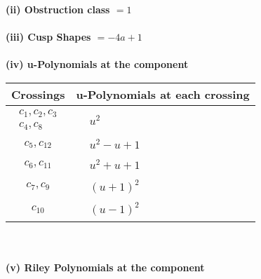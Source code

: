 \documentclass[1p]{elsarticle_modified}
\theoremstyle{definition}
\begin{document}
\flushleft \textbf{(ii) Obstruction class $= 1$}\\~\\
\flushleft \textbf{(iii) Cusp Shapes $= -4 a+1$}\\~\\
\newpage\renewcommand{\arraystretch}{1}
\flushleft \textbf{(iv) u-Polynomials at the component}\newline \\
\begin{tabular}{m{50pt}|m{274pt}}
Crossings & \hspace{64pt}u-Polynomials at each crossing \\
\hline $$\begin{aligned}c_{1},c_{2},c_{3}\\c_{4},c_{8}\end{aligned}$$&$\begin{aligned}
&u^2
\end{aligned}$\\
\hline $$\begin{aligned}c_{5},c_{12}\end{aligned}$$&$\begin{aligned}
&u^2- u+1
\end{aligned}$\\
\hline $$\begin{aligned}c_{6},c_{11}\end{aligned}$$&$\begin{aligned}
&u^2+u+1
\end{aligned}$\\
\hline $$\begin{aligned}c_{7},c_{9}\end{aligned}$$&$\begin{aligned}
&(u+1)^2
\end{aligned}$\\
\hline $$\begin{aligned}c_{10}\end{aligned}$$&$\begin{aligned}
&(u-1)^2
\end{aligned}$\\
\hline
\end{tabular}\\~\\
\newpage\renewcommand{\arraystretch}{1}
\flushleft \textbf{(v) Riley Polynomials at the component}\newline \\
\end{document}
